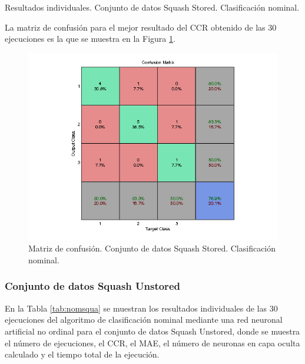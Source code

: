 			\begin{table}[!htbp]
				\centering
				\caption{Resultados individuales. Conjunto de datos Squash Stored. Clasificación nominal.}
				\label{tab:nomsqu}
			\end{table}
			
			La matriz de confusión para el mejor resultado del CCR obtenido de las 30 ejecuciones es la que se muestra en la Figura \ref{fig:nomsqu}.
			
			\begin{figure}[htbp]
				\centering
				\includegraphics[scale=0.8]{../src/results/nominal/squash-stored_mc25.png}
				\caption{Matriz de confusión. Conjunto de datos Squash Stored. Clasificación nominal.}
				\label{fig:nomsqu}
			\end{figure}

			\subsubsection{Conjunto de datos Squash Unstored}
			
			En la Tabla \ref{tab:nomsqua} se muestran los resultados individuales de las 30 ejecuciones del algoritmo de clasificación nominal mediante una red neuronal artificial no ordinal para el conjunto de datos Squash Unstored, donde se muestra el número de ejecuciones, el CCR, el MAE, el número de neuronas en capa oculta calculado y el tiempo total de la ejecución.\\
			
